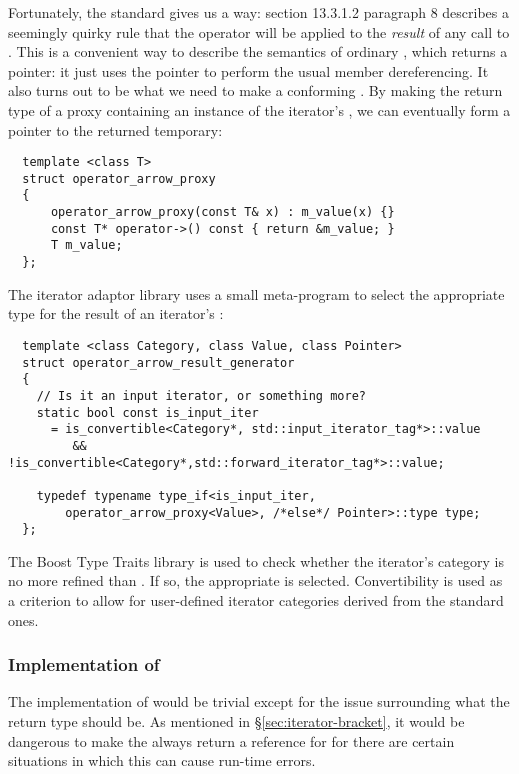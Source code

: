 \documentclass{netobjectdays}
\begin{document}
Fortunately, the standard gives us a way: section 13.3.1.2 paragraph 8
describes a seemingly quirky rule that the \code{->} operator will be
applied to the \emph{result} of any call to . This is
a convenient way to describe the semantics of ordinary
, which returns a pointer: it just uses the pointer
to perform the usual member dereferencing. It also turns out to be
what we need to make a conforming . By
making the return type of  a proxy containing an
instance of the iterator's , we can eventually form
a  pointer to the returned temporary:

{\footnotesize
\begin{verbatim}
  template <class T>
  struct operator_arrow_proxy
  {
      operator_arrow_proxy(const T& x) : m_value(x) {}
      const T* operator->() const { return &m_value; }
      T m_value;
  };
\end{verbatim}
}

The iterator adaptor library uses a small meta-program to select the
appropriate type for the result of an iterator's :

{\footnotesize
\begin{verbatim}
  template <class Category, class Value, class Pointer>
  struct operator_arrow_result_generator
  {
    // Is it an input iterator, or something more?
    static bool const is_input_iter
      = is_convertible<Category*, std::input_iterator_tag*>::value
         && !is_convertible<Category*,std::forward_iterator_tag*>::value;

    typedef typename type_if<is_input_iter,
        operator_arrow_proxy<Value>, /*else*/ Pointer>::type type;
  };
\end{verbatim}
}

The Boost Type Traits library is used to check whether the iterator's
category is no more refined than . If so,
the appropriate  is selected.
Convertibility is used as a criterion to allow for user-defined
iterator categories derived from the standard ones.


\subsubsection{Implementation of }

The implementation of  would be trivial except for
the issue surrounding what the return type should be.  As mentioned in
\S\ref{sec:iterator-bracket}, it would be dangerous to make the
 always return a reference for
 for there are certain situations in which this can
cause run-time errors.
\end{document}
